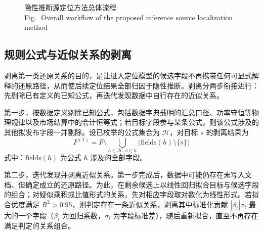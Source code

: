 \documentclass[UTF8,zihao=5,twoside]{ctexart}
\newcommand{\figbicaption}[2]{\caption{#1\\[-0.2em]\small Fig.\,\thefigure\ #2}}
\begin{document}
\begin{figure}[!tbp]
\centering
{}
\figbicaption{隐性推断源定位方法总体流程}{Overall workflow of the proposed inference source localization method}
\label{fig:flow}
\end{figure}

\subsection{规则公式与近似关系的剥离}

剥离第一类还原关系的目的，是让进入定位模型的候选字段不再携带任何可显式解释的还原路径，从而使后续定位结果全部归因于隐性推断。剥离分两步衔接进行：先剔除已有定义的已知公式，再迭代发现数据中自行存在的近似关系。

第一步，按数据定义剔除已知公式，包括数据字典载明的汇总口径、功率守恒等物理规律以及市场结算中的会计恒等式；若目标字段参与某条公式，则该公式涉及的其他拟发布字段一并剔除。设已枚举的公式集合为 $\mathcal{H}$，对目标 $s$ 的剥离结果为
\begin{equation}
F^{(1)}=F\setminus\bigcup_{h\in\mathcal{H}:\,s\in h}\big(\mathrm{fields}(h)\setminus\{s\}\big)
\end{equation}
式中：$\mathrm{fields}(h)$ 为公式 $h$ 涉及的全部字段。

第二步，迭代发现并剥离近似关系。第一步完成后，数据中可能仍存在未写入文档、但确定成立的还原路径。为此，在剩余候选上以线性回归拟合目标与候选字段的组合；对疑似乘积或比值形式的关系，先对相应字段取对数化为线性形式。若拟合优度满足 $R^2>0.95$，则判定存在一条近似关系，剥离其中标准化贡献 $|\beta_i|\sigma_i$ 最大的一个字段（$\beta_i$ 为回归系数，$\sigma_i$ 为字段标准差），随后重新拟合，直至不再存在满足判定的关系组合。
\end{document}
